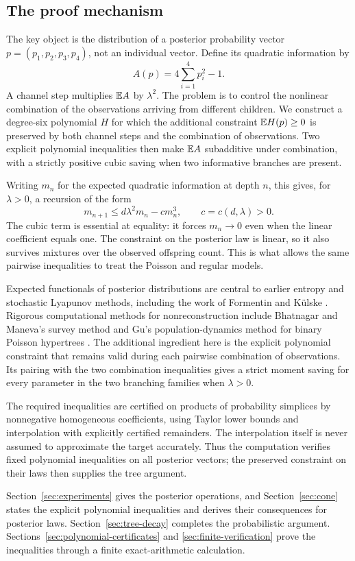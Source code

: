 \subsection{The proof mechanism}
The key object is the distribution of a posterior probability vector
$p=(p_1,p_2,p_3,p_4)$, not an individual vector. Define its quadratic
information by
\[
 A(p)=4\sum_{i=1}^4p_i^2-1.
\]
A channel step multiplies $\mathbb E A$ by $\lambda^2$. The problem is to control
the nonlinear combination of the observations arriving from different
children. We construct a degree-six polynomial $H$ for which the
additional constraint $\mathbb E H(p)\geq0$ is preserved by both channel steps
and the combination of observations. Two explicit polynomial inequalities
then make $\mathbb E A$ subadditive under combination, with a strictly positive
cubic saving when two informative branches are present.

Writing $m_n$ for the expected quadratic information at depth $n$, this
gives, for $\lambda>0$, a recursion of the form
\[
 m_{n+1}\leq d\lambda^2m_n-cm_n^3,
 \qquad c=c(d,\lambda)>0.
\]
The cubic term is essential at equality: it forces $m_n\to0$ even when
the linear coefficient equals one. The constraint on the posterior law
is linear, so it also survives mixtures over the observed offspring
count. This is what allows the same pairwise inequalities to treat the
Poisson and regular models.

Expected functionals of posterior distributions are central to earlier
entropy and stochastic Lyapunov methods, including the work of Formentin
and K\"ulske \cite{FormentinKulske2009}. Rigorous computational methods
for nonreconstruction include Bhatnagar and Maneva's survey method
\cite{BhatnagarManeva2011} and Gu's population-dynamics method for binary
Poisson hypertrees \cite{Gu2026}. The additional ingredient here is the
explicit polynomial constraint that remains valid during each pairwise
combination of observations. Its pairing with the two combination
inequalities gives a strict moment saving for every parameter in the two
branching families when $\lambda>0$.

The required inequalities are certified on products of
probability simplices by nonnegative homogeneous coefficients, using
Taylor lower bounds and interpolation with explicitly certified
remainders. The interpolation itself is never assumed to approximate
the target accurately. Thus the computation verifies fixed polynomial
inequalities on all posterior vectors; the preserved constraint on their
laws then supplies the tree argument.

Section~\ref{sec:experiments} gives the posterior operations, and
Section~\ref{sec:cone} states the explicit polynomial inequalities and
derives their consequences for posterior laws.
Section~\ref{sec:tree-decay} completes the probabilistic argument.
Sections~\ref{sec:polynomial-certificates} and
\ref{sec:finite-verification} prove the inequalities through a finite
exact-arithmetic calculation.
